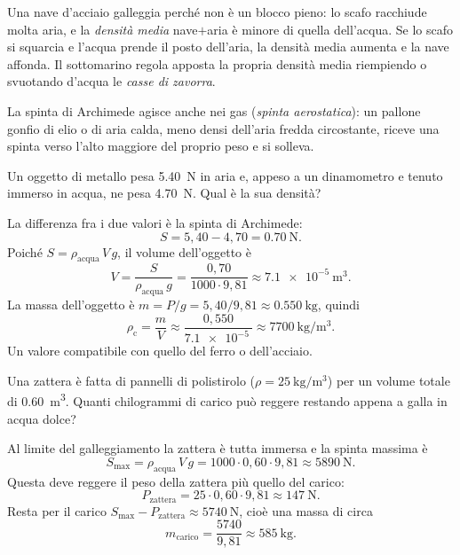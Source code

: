\begin{remark}
Una nave d'acciaio galleggia perché non è un blocco pieno: lo scafo racchiude molta aria, e la \emph{densità media} nave$+$aria è minore di quella dell'acqua. Se lo scafo si squarcia e l'acqua prende il posto dell'aria, la densità media aumenta e la nave affonda. Il sottomarino regola apposta la propria densità media riempiendo o svuotando d'acqua le \emph{casse di zavorra}.
\end{remark}

La spinta di Archimede agisce anche nei gas (\emph{spinta aerostatica}): un pallone gonfio di elio o di aria calda, meno densi dell'aria fredda circostante, riceve una spinta verso l'alto maggiore del proprio peso e si solleva.

\begin{testexample}
Un oggetto di metallo pesa \SI{5,40}{\newton} in aria e, appeso a un dinamometro e tenuto immerso in acqua, ne pesa \SI{4,70}{\newton}. Qual è la sua densità?

La differenza fra i due valori è la spinta di Archimede:
\[ S = 5{,}40 - 4{,}70 = \SI{0,70}{\newton}. \]
Poiché $S = \rho_\text{acqua}\,V\,g$, il volume dell'oggetto è
\[ V = \frac{S}{\rho_\text{acqua}\,g} = \frac{0{,}70}{1000 \cdot 9{,}81} \approx \SI{7,1e-5}{\metre\cubed}. \]
La massa dell'oggetto è $m = P/g = 5{,}40/9{,}81 \approx \SI{0,550}{\kilo\gram}$, quindi
\[ \rho_\text{c} = \frac{m}{V} \approx \frac{0{,}550}{\SI{7,1e-5}{}} \approx \SI{7700}{\kilo\gram\per\metre\cubed}. \]
Un valore compatibile con quello del ferro o dell'acciaio.
\end{testexample}

\begin{testexample}
Una zattera è fatta di pannelli di polistirolo ($\rho = \SI{25}{\kilo\gram\per\metre\cubed}$) per un volume totale di \SI{0,60}{\metre\cubed}. Quanti chilogrammi di carico può reggere restando appena a galla in acqua dolce?

Al limite del galleggiamento la zattera è tutta immersa e la spinta massima è
\[ S_\text{max} = \rho_\text{acqua}\,V\,g = 1000 \cdot 0{,}60 \cdot 9{,}81 \approx \SI{5890}{\newton}. \]
Questa deve reggere il peso della zattera più quello del carico:
\[ P_\text{zattera} = 25 \cdot 0{,}60 \cdot 9{,}81 \approx \SI{147}{\newton}. \]
Resta per il carico $S_\text{max} - P_\text{zattera} \approx \SI{5740}{\newton}$, cioè una massa di circa
\[ m_\text{carico} = \frac{5740}{9{,}81} \approx \SI{585}{\kilo\gram}. \]
\end{testexample}

